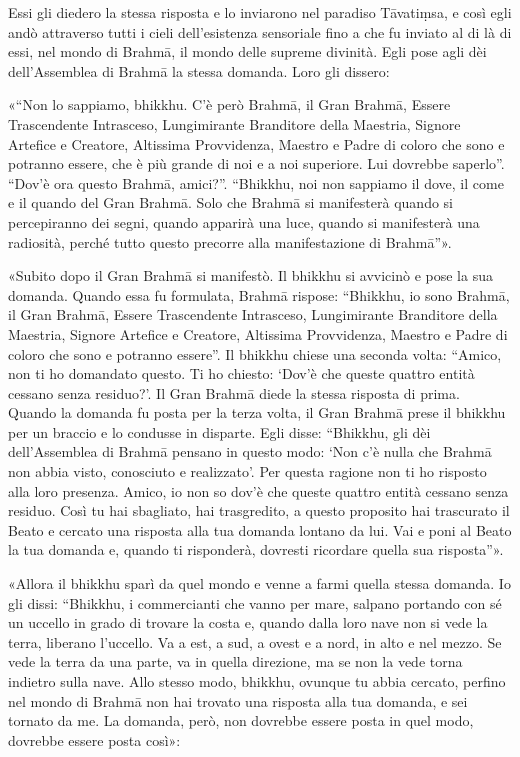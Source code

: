 Essi gli diedero la stessa risposta e lo inviarono
nel paradiso Tāvatiṃsa, e così egli andò attraverso tutti i cieli
dell’esistenza sensoriale fino a che fu inviato al di là di essi, nel
mondo di Brahmā, il mondo delle supreme divinità. Egli pose agli dèi
dell’Assemblea di Brahmā la stessa domanda. Loro gli dissero:


 «“Non lo sappiamo, bhikkhu. C’è però Brahmā, il Gran Brahmā,
Essere Trascendente Intrasceso, Lungimirante Branditore della Maestria,
Signore Artefice e Creatore, Altissima Provvidenza, Maestro e Padre di
coloro che sono e potranno essere, che è più grande di noi e a noi
superiore. Lui dovrebbe saperlo”. “Dov’è ora questo Brahmā, amici?”.
“Bhikkhu, noi non sappiamo il dove, il come e il quando del Gran Brahmā.
Solo che Brahmā si manifesterà quando si percepiranno dei segni, quando
apparirà una luce, quando si manifesterà una radiosità, perché tutto
questo precorre alla manifestazione di Brahmā”».


«Subito dopo il Gran Brahmā si manifestò. Il bhikkhu si avvicinò e pose
la sua domanda. Quando essa fu formulata, Brahmā rispose: “Bhikkhu, io
sono Brahmā, il Gran Brahmā, Essere Trascendente Intrasceso,
Lungimirante Branditore della Maestria, Signore Artefice e Creatore,
Altissima Provvidenza, Maestro e Padre di coloro che sono e potranno
essere”. Il bhikkhu chiese una seconda volta: “Amico, non ti ho
domandato questo. Ti ho chiesto: ‘Dov’è che queste quattro entità
cessano senza residuo?’. Il Gran Brahmā diede la stessa risposta di
prima. Quando la domanda fu posta per la terza volta, il Gran Brahmā
prese il bhikkhu per un braccio e lo condusse in disparte. Egli disse:
“Bhikkhu, gli dèi dell’Assemblea di Brahmā pensano in questo modo: ‘Non
c’è nulla che Brahmā non abbia visto, conosciuto e realizzato’. Per
questa ragione non ti ho risposto alla loro presenza. Amico, io non so
dov’è che queste quattro entità cessano senza residuo. Così tu hai
sbagliato, hai trasgredito, a questo proposito hai trascurato il Beato e
cercato una risposta alla tua domanda lontano da lui. Vai e poni al
Beato la tua domanda e, quando ti risponderà, dovresti ricordare quella
sua risposta”».


«Allora il bhikkhu sparì da quel mondo e venne a farmi quella stessa
domanda. Io gli dissi: “Bhikkhu, i commercianti che vanno per mare,
salpano portando con sé un uccello in grado di trovare la costa e,
quando dalla loro nave non si vede la terra, liberano l’uccello. Va a
est, a sud, a ovest e a nord, in alto e nel mezzo. Se vede la terra da
una parte, va in quella direzione, ma se non la vede torna indietro
sulla nave. Allo stesso modo, bhikkhu, ovunque tu abbia cercato, perfino
nel mondo di Brahmā non hai trovato una risposta alla tua domanda, e sei
tornato da me. La domanda, però, non dovrebbe essere posta in quel modo,
dovrebbe essere posta così»:


